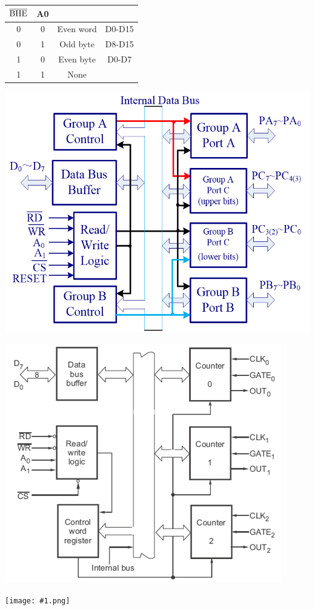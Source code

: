 \documentclass[10pt,a4paper]{article}
\def\img#1#2{\begin{tcolorbox}[title=#2]\texttt{[image: \#1.png]}\end{tcolorbox}}
\begin{document}
\begin{CJK}{UTF8}{song}
\begin{twocolumn}
\begin{tcolorbox}[title=8086存储组织]
			\begin{tabular}{|c|c|c|c|}
				\hline
				$\rm \overline{BHE}$ & A0 &  &  \\
				\hline
				0 & 0 & Even word & D0-D15 \\
				\hline
				0 & 1 & Odd byte & D8-D15 \\
				\hline
				1 & 0 & Even byte & D0-D7 \\
				\hline
				1 & 1 & None &  \\
				\hline
			\end{tabular}
		\end{tcolorbox}
		\begin{tcolorbox}[title=8255 外设芯片]
			\centering
			\includegraphics[width=0.7\linewidth]{8255.png}
		\end{tcolorbox}
		\begin{tcolorbox}[title=8253 计时器]
			\centering
			\includegraphics[width=0.7\linewidth]{8253.png}
		\end{tcolorbox}
		\begin{tcolorbox}[title=8253 计时器模式]
			\img{Mode0}{Mode 0---Interrupt on Terminal Count}

\end{tcolorbox}
\end{twocolumn}
\end{CJK}
\end{document}
